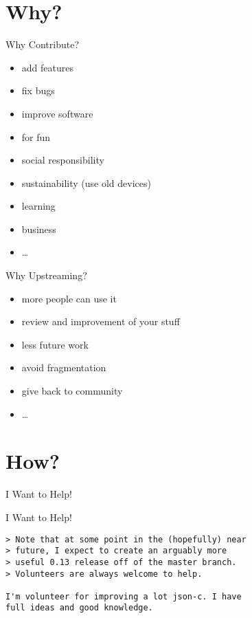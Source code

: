 \documentclass{beamer}
\begin{document}
\section{Why?}

\frame{\tableofcontents[currentsection]}

\begin{frame}{Why Contribute?}
    \begin{itemize}
        \item add features
        \item fix bugs
        \item improve software
        \item for fun
        \item social responsibility
        \item sustainability (use old devices)
        \item learning
        \item business
        \item \dots
    \end{itemize}
\end{frame}

\begin{frame}{Why Upstreaming?}
    \begin{itemize}
        \item more people can use it
        \item review and improvement of your stuff
        \item less future work
        \item avoid fragmentation
        \item give back to community
        \item \dots
    \end{itemize}
\end{frame}


\section{How?}

\frame{\tableofcontents[currentsection]}

\begin{frame}[fragile]{I Want to Help!}
\end{frame}

\begin{frame}[fragile]{I Want to Help!}
    \begin{verbatim}
> Note that at some point in the (hopefully) near
> future, I expect to create an arguably more
> useful 0.13 release off of the master branch.
> Volunteers are always welcome to help.

I'm volunteer for improving a lot json-c. I have
full ideas and good knowledge.
    \end{verbatim}
\end{frame}
\end{document}
